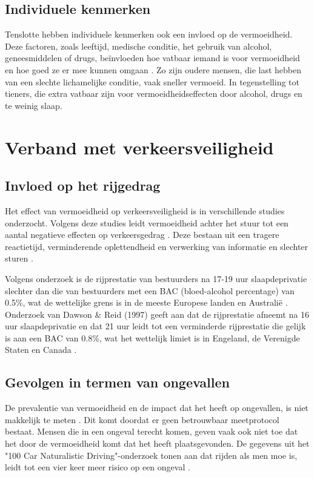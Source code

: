\subsection{Individuele kenmerken}
Tenslotte hebben individuele kenmerken ook een invloed op de vermoeidheid. Deze factoren, zoals leeftijd, medische conditie, het gebruik van alcohol, geneesmiddelen of drugs, beïnvloeden hoe vatbaar iemand is voor vermoeidheid en hoe goed ze er mee kunnen omgaan \autocite{VanSchagen2003}. Zo zijn oudere mensen, die last hebben van een slechte lichamelijke conditie, vaak sneller vermoeid. In tegenstelling tot tieners, die extra vatbaar zijn voor vermoeidheidseffecten door alcohol, drugs en te weinig slaap.

\section{Verband met verkeersveiligheid}
\subsection{Invloed op het rijgedrag}
Het effect van vermoeidheid op verkeersveiligheid is in verschillende studies onderzocht. Volgens deze studies leidt vermoeidheid achter het stuur tot een aantal negatieve effecten op verkeersgedrag \autocite{RiguelleGoldenbeld}. Deze bestaan uit een tragere reactietijd, verminderende oplettendheid en verwerking van informatie en slechter sturen \autocite{Bartlett,Friswell2008}. 

Volgens onderzoek is de rijprestatie van bestuurders na 17-19 uur slaapdeprivatie slechter dan die van bestuurders met een BAC (bloed-alcohol percentage) van 0.5\%, wat de wettelijke grens is in de meeste Europese landen en Australië \autocite{Williamson2000}. Onderzoek van Dawson \& Reid (1997) geeft aan dat de rijprestatie afneemt na 16 uur slaapdeprivatie en dat 21 uur leidt tot een verminderde rijprestatie die gelijk is aan een BAC van 0.8\%, wat het wettelijk limiet is in Engeland, de Verenigde Staten en Canada \autocite{Dawson1997}.
\subsection{Gevolgen in termen van ongevallen}
De prevalentie van vermoeidheid en de impact dat het heeft op ongevallen, is niet makkelijk te meten \autocite{Diependaele2015}. Dit komt doordat er geen betrouwbaar meetprotocol bestaat. Mensen die in een ongeval terecht komen, geven vaak ook niet toe dat het door de vermoeidheid komt dat het heeft plaatsgevonden. De gegevens uit het "100 Car Naturalistic Driving"-onderzoek tonen aan dat rijden als men moe is, leidt tot een vier keer meer risico op een ongeval \autocite{Klauer2006}.


